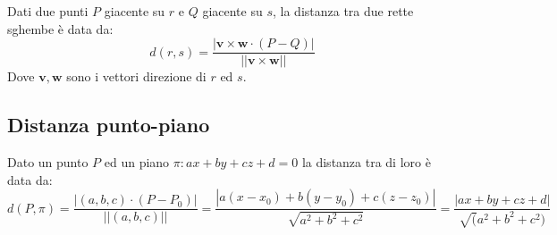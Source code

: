 \documentclass{article}
\begin{document}
    \vspace{10pt}
    Dati due punti $P$ giacente su $r$ e $Q$ giacente su $s$, la distanza tra due rette sghembe è data da:
    \[
        d(r, s) = \frac{|\mathbf{v} \times \mathbf{w} \cdot (P - Q)|}{||\mathbf{v} \times \mathbf{w}||}
    \]
    Dove $\mathbf{v}, \mathbf{w}$ sono i vettori direzione di $r$ ed $s$.



\subsection{Distanza punto-piano}
    Dato un punto $P$ ed un piano $\pi : ax + by + cz + d = 0$ la distanza tra di loro è data da: 
    \[
        d(P, \pi) = \frac{|(a, b, c) \cdot (P - P_0)|}{||(a, b, c)||} = \frac{|a(x - x_0) + b(y - y_0) + c(z - z_0)|}{\sqrt{a^2 + b^2 + c^2}} = \frac{|ax + by + cz + d|}{\sqrt(a^2 + b^2 + c^2)}
    \]
    
\end{document}

